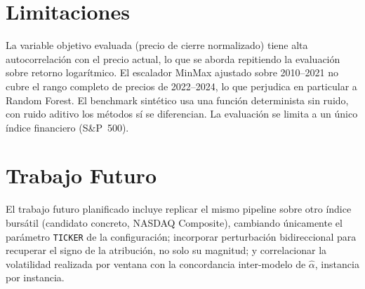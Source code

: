 \section{Limitaciones}

La variable objetivo evaluada (precio de cierre normalizado) tiene alta autocorrelación con el precio actual, lo que se aborda repitiendo la evaluación sobre retorno logarítmico. El escalador MinMax ajustado sobre 2010--2021 no cubre el rango completo de precios de 2022--2024, lo que perjudica en particular a Random Forest. El benchmark sintético usa una función determinista sin ruido, con ruido aditivo los métodos sí se diferencian. La evaluación se limita a un único índice financiero (S\&P~500).

\section{Trabajo Futuro}

El trabajo futuro planificado incluye replicar el mismo pipeline sobre otro índice bursátil (candidato concreto, NASDAQ Composite), cambiando únicamente el parámetro \texttt{TICKER} de la configuración; incorporar perturbación bidireccional para recuperar el signo de la atribución, no solo su magnitud; y correlacionar la volatilidad realizada por ventana con la concordancia inter-modelo de $\hat{\alpha}$, instancia por instancia.
